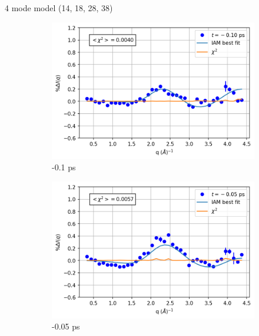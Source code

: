 \documentclass{beamer}
\newcommand\w{0.32}
\begin{document}
\begin{frame}{4 mode model (14, 18, 28, 38)}
	\begin{figure}
		\centering
		\begin{subfigure}[b]{\w\textwidth}
			\centering
			\includegraphics[width=\textwidth]{figures/10000_vstrongmodes_-0.10.png}
			\caption{-0.1 ps}
		\end{subfigure}
		\begin{subfigure}[b]{\w\textwidth}
			\centering
			\includegraphics[width=\textwidth]{figures/10000_vstrongmodes_-0.05.png}
			\caption{-0.05 ps}
		\end{subfigure}
		\begin{subfigure}[b]{\w\textwidth}
			\centering

\end{subfigure}
\end{figure}
\end{frame}
\end{document}
